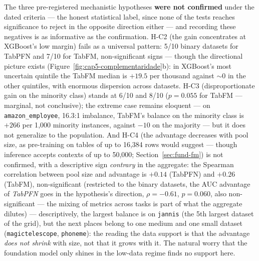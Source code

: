 The three pre-registered mechanistic hypotheses \textbf{were not
confirmed} under the dated criteria --- the honest statistical
label, since none of the tests reaches significance to reject in the
opposite direction either --- and recording these negatives is as
informative as the confirmation. H-C2 (the gain concentrates at
XGBoost's low margin) fails as a universal pattern: 5/10 binary
datasets for TabPFN and 7/10 for TabFM, non-significant signs ---
though the directional picture exists
(Figure~\ref{fig:cap5-complementaridade}b): in XGBoost's most
uncertain quintile the TabFM median is $+19.5$ per thousand against
${\sim}0$ in the other quintiles, with enormous dispersion across
datasets. H-C3 (disproportionate gain on the minority class) stands
at 6/10 and 8/10 ($p = 0.055$ for TabFM --- marginal, not
conclusive); the extreme case remains eloquent --- on
\texttt{amazon\_\allowbreak employee}, 16.3:1 imbalance, TabFM's
balance on the minority class is $+266$ per 1{,}000 minority
instances, against $-10$ on the majority --- but it does not
generalize to the population. And H-C4 (the advantage decreases with
pool size, as pre-training on tables of up to 16{,}384 rows would
suggest --- though inference accepts contexts of up to 50{,}000;
Section~\ref{sec:fund-fm}) is not confirmed, with a descriptive sign
\emph{contrary} in the aggregate: the Spearman correlation between
pool size and advantage is $+0.14$ (TabPFN) and $+0.26$ (TabFM),
non-significant (restricted to the binary datasets, the AUC
advantage of \emph{TabPFN} goes in the hypothesis's direction,
$\rho=-0.61$, $p=0.060$, also non-significant --- the mixing of
metrics across tasks is part of what the aggregate dilutes) ---
descriptively, the largest balance is on \texttt{jannis} (the 5th
largest dataset of the grid), but the next places belong to one
medium and one small dataset (\texttt{magictelescope},
\texttt{phoneme}): the reading the data support is that the
advantage \emph{does not shrink} with size, not that it grows with
it. The natural worry that the foundation model only shines in the
low-data regime finds no support here.

